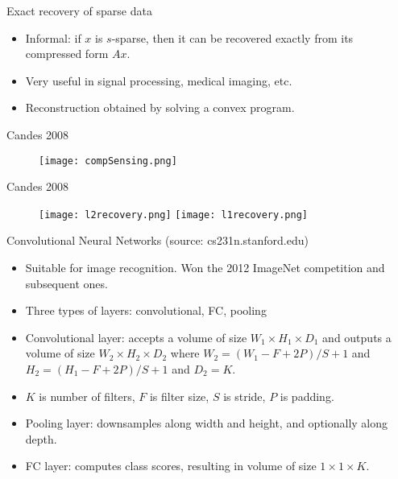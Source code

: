\documentclass[final]{beamer}
\begin{document}
\begin{frame}{Exact recovery of sparse data}
	\begin{itemize}
		\item Informal: if $x$ is $s$-sparse, then it can be recovered exactly from its compressed form $Ax.$
		\pause
		\item Very useful in signal processing, medical imaging, etc.
		\pause
		\item Reconstruction obtained by solving a convex program.
	\end{itemize}

\end{frame}
\begin{frame}{Candes 2008}
	\begin{figure}
	\texttt{[image: compSensing.png]}
\end{figure}
\end{frame}
\begin{frame}{Candes 2008}
	\begin{figure}
	\texttt{[image: l2recovery.png]}
	\texttt{[image: l1recovery.png]}
	\end{figure}
\end{frame}
\begin{frame}{Convolutional Neural Networks (source: cs231n.stanford.edu)}
	\begin{itemize}
		\item Suitable for image recognition. Won the 2012 ImageNet competition and subsequent ones.
		\item Three types of layers: convolutional, FC, pooling
		\item Convolutional layer: accepts a volume of size $W_1 \times H_1 \times D_1$ and outputs a volume of size $W_2 \times H_2 \times D_2$ where $W_2 = (W_1 - F + 2P)/S + 1$ and $H_2 = (H_1 - F + 2P)/S + 1$ and $D_2 = K$.

		\item $K$ is number of filters, $F$ is filter size, $S$ is stride, $P$ is padding.
		\item Pooling layer: downsamples along width and height, and optionally along depth.
		\item FC layer: computes class scores, resulting in volume of size $1 \times 1 \times K$.

	
	\end{itemize}
\end{frame}
\end{document}
